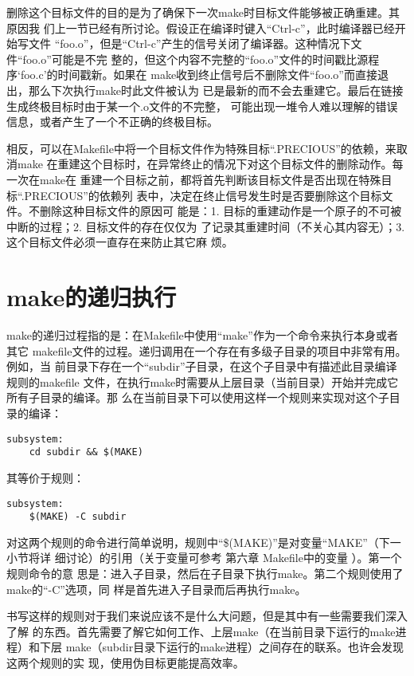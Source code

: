 删除这个目标文件的目的是为了确保下一次make时目标文件能够被正确重建。其原因我
们上一节已经有所讨论。假设正在编译时键入“Ctrl-c”，此时编译器已经开始写文件
“foo.o”，但是“Ctrl-c”产生的信号关闭了编译器。这种情况下文件“foo.o”可能是不完
整的，但这个内容不完整的“foo.o”文件的时间戳比源程序‘foo.c’的时间戳新。如果在
make收到终止信号后不删除文件“foo.o”而直接退出，那么下次执行make时此文件被认为
已是最新的而不会去重建它。最后在链接生成终极目标时由于某一个.o文件的不完整，
可能出现一堆令人难以理解的错误信息，或者产生了一个不正确的终极目标。

相反，可以在Makefile中将一个目标文件作为特殊目标“.PRECIOUS”的依赖，来取消make
在重建这个目标时，在异常终止的情况下对这个目标文件的删除动作。每一次在make在
重建一个目标之前，都将首先判断该目标文件是否出现在特殊目标“.PRECIOUS”的依赖列
表中，决定在终止信号发生时是否要删除这个目标文件。不删除这种目标文件的原因可
能是：1. 目标的重建动作是一个原子的不可被中断的过程；2. 目标文件的存在仅仅为
了记录其重建时间（不关心其内容无）；3. 这个目标文件必须一直存在来防止其它麻
烦。

\section{make的递归执行}
make的递归过程指的是：在Makefile中使用“make”作为一个命令来执行本身或者其它
makefile文件的过程。递归调用在一个存在有多级子目录的项目中非常有用。例如，当
前目录下存在一个“subdir”子目录，在这个子目录中有描述此目录编译规则的makefile
文件，在执行make时需要从上层目录（当前目录）开始并完成它所有子目录的编译。那
么在当前目录下可以使用这样一个规则来实现对这个子目录的编译：
\begin{Verbatim}[]
subsystem:
    cd subdir && $(MAKE)
\end{Verbatim}

其等价于规则：
\begin{Verbatim}[]
subsystem:
    $(MAKE) -C subdir
\end{Verbatim}

对这两个规则的命令进行简单说明，规则中“\$(MAKE)”是对变量“MAKE”（下一小节将详
细讨论）的引用（关于变量可参考 第六章 Makefile中的变量 ）。第一个规则命令的意
思是：进入子目录，然后在子目录下执行make。第二个规则使用了make的“-C”选项，同
样是首先进入子目录而后再执行make。

书写这样的规则对于我们来说应该不是什么大问题，但是其中有一些需要我们深入了解
的东西。首先需要了解它如何工作、上层make（在当前目录下运行的make进程）和下层
make（subdir目录下运行的make进程）之间存在的联系。也许会发现这两个规则的实
现，使用伪目标更能提高效率。

